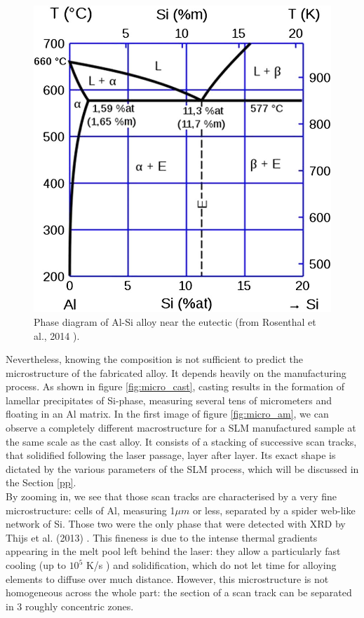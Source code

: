 \begin{figure}[ht]
	\centering
	\includegraphics[scale=0.35]{Images/phase_diagram}
	\decoRule
	\caption[Phase diagram of Al-Si alloy near the eutectic]{Phase diagram of Al-Si alloy near the eutectic (from Rosenthal et al., 2014 \parencite{Rosenthal14}).}
	\label{fig:phase_diagram}
\end{figure}

Nevertheless, knowing the composition is not sufficient to predict the microstructure of the fabricated alloy. It depends heavily on the manufacturing process.  As shown in figure \ref{fig:micro_cast}, casting results in the formation of lamellar precipitates of Si-phase, measuring several tens of micrometers and floating in an Al matrix. In the first image of figure \ref{fig:micro_am}, we can observe a completely different macrostructure for a SLM manufactured sample at the same scale as the cast alloy. It consists of a stacking of successive scan tracks, that solidified following the laser passage, layer after layer. Its exact shape is dictated by the various parameters of the SLM process, which will be discussed in the Section \ref{pp}.\\

By zooming in, we see that those scan tracks are characterised by a very fine microstructure: cells of Al, measuring 1$\mu m$ or less, separated by a spider web-like network of Si. Those two were the only phase that were detected with XRD by Thijs et al. (2013) \cite{Thijs13}. This fineness is due to the intense thermal gradients appearing in the melt pool left behind the laser: they allow a particularly fast cooling (up to $10^5$ K/s \cite{PRASHANTH14}) and solidification, which do not let time for alloying elements to diffuse over much distance. However, this microstructure is not homogeneous across the whole part: the section of a scan track can be separated in 3 roughly concentric zones.\\

